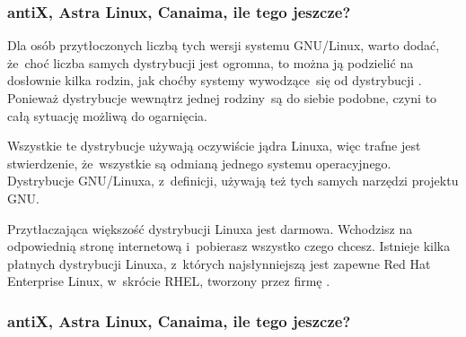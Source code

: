 \documentclass[10pt,t]{beamer}
\begin{document}
\begin{frame}
  \frametitle{antiX, Astra Linux, Canaima, ile tego jeszcze?}


  Dla osób przytłoczonych liczbą tych wersji systemu GNU/Linux, warto
  dodać, że~choć liczba samych dystrybucji jest ogromna, to można ją
  podzielić na dosłownie kilka rodzin, jak choćby systemy wywodzące~się od
  dystrybucji
  . Ponieważ
  dystrybucje wewnątrz jednej rodziny~są do siebie podobne, czyni to całą
  sytuację możliwą do ogarnięcia.

  Wszystkie te dystrybucje używają oczywiście jądra Linuxa, więc
  trafne jest stwierdzenie, że~wszystkie są odmianą jednego systemu
  operacyjnego. Dystrybucje GNU/Linuxa, z~definicji, używają też tych
  samych narzędzi projektu GNU.

  Przytłaczająca większość dystrybucji Linuxa jest darmowa. Wchodzisz
  na odpowiednią stronę internetową i~pobierasz wszystko czego chcesz.
  Istnieje kilka płatnych dystrybucji Linuxa, z~których najsłynniejszą jest
  zapewne
  {Red Hat Enterprise Linux}, w~skrócie RHEL, tworzony przez firmę
  .

\end{frame}




\begin{frame}
  \frametitle{antiX, Astra Linux, Canaima, ile tego jeszcze?}



\end{frame}
\end{document}
